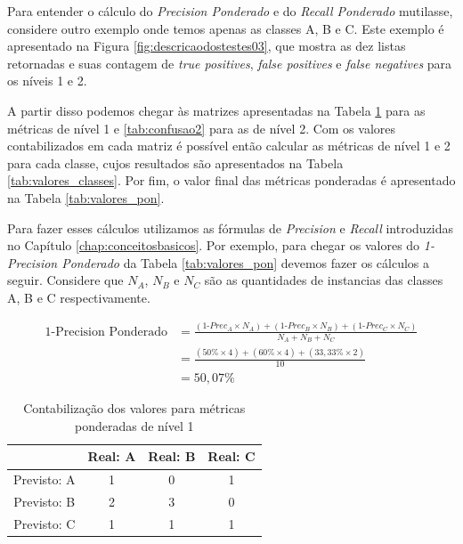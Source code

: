 Para entender o cálculo do \textit{Precision Ponderado} e do \textit{Recall Ponderado} mutilasse, considere outro exemplo onde temos apenas as classes A, B e C.
Este exemplo é apresentado na Figura \ref{fig:descricaodostestes03}, que mostra as dez listas retornadas e suas contagem de \textit{true positives}, \textit{false positives} e \textit{false negatives} para os níveis 1 e 2.

A partir disso podemos chegar às matrizes apresentadas na Tabela \ref{tab:confusao1} para as métricas de nível 1 e \ref{tab:confusao2} para as de nível 2.
Com os valores contabilizados em cada matriz é possível então calcular as métricas de nível 1 e 2 para cada classe, cujos resultados são apresentados na Tabela \ref{tab:valores_classes}.
Por fim, o valor final das métricas ponderadas é apresentado na Tabela \ref{tab:valores_pon}.

Para fazer esses cálculos utilizamos as fórmulas de \textit{Precision} e \textit{Recall} introduzidas no Capítulo \ref{chap:conceitosbasicos}.
Por exemplo, para chegar os valores do \textit{1-Precision Ponderado} da Tabela \ref{tab:valores_pon} devemos fazer os cálculos a seguir.
Considere que $N_A$, $N_B$ e $N_C$ são as quantidades de instancias das classes A, B e C respectivamente.

\begin{align*}
\text{1-Precision Ponderado} &= \frac{(\text{1-$Prec_A$} \times N_A)+(\text{1-$Prec_B$} \times N_B)+(\text{1-$Prec_C$} \times N_C)}{N_A+N_B+N_C} \\
&= \frac{(50\% \times 4)+(60\% \times 4)+(33,33\% \times 2)}{10} \\
&= 50,07\%
\end{align*}

\begin{table}[h!]
  \begin{center}
    \begin{tabular}{cccc}
      \hline
         & \textbf{Real: A} & \textbf{Real: B} & \textbf{Real: C} \\
      \hline

      Previsto: A & 1 & 0 & 1\\
      Previsto: B & 2 & 3 & 0\\
      Previsto: C & 1 & 1 & 1\\

      \hline
    \end{tabular}
    \caption{Contabilização dos valores para métricas ponderadas de nível 1}
    \label{tab:confusao1}
  \end{center}
\end{table}

